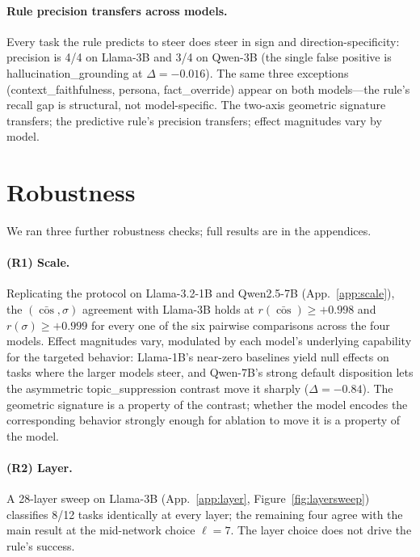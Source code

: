 \documentclass[11pt]{article}
\begin{document}
\paragraph{Rule precision transfers across models.}
Every task the rule predicts to steer does steer in sign and
direction-specificity: precision is 4/4 on Llama-3B and 3/4 on
Qwen-3B (the single false positive is hallucination\_grounding at
$\Delta = -0.016$). The same three exceptions
(context\_faithfulness, persona, fact\_override) appear on both
models---the rule's recall gap is structural, not model-specific.
The two-axis geometric signature transfers; the predictive rule's
precision transfers; effect magnitudes vary by model.

\section{Robustness}
\label{sec:robustness}

We ran three further robustness checks; full results are in the
appendices.

\paragraph{(R1) Scale.}
Replicating the protocol on Llama-3.2-1B and Qwen2.5-7B
(App.~\ref{app:scale}), the $(\bar{\cos}, \sigma)$ agreement with
Llama-3B holds at $r(\bar{\cos}) \geq +0.998$ and
$r(\sigma) \geq +0.999$ for every one of the six pairwise
comparisons across the four models. Effect magnitudes vary,
modulated by each model's underlying capability for the targeted
behavior: Llama-1B's near-zero baselines yield null effects on
tasks where the larger models steer, and Qwen-7B's strong default
disposition lets the asymmetric topic\_suppression contrast move it
sharply ($\Delta = -0.84$). The geometric signature is a property
of the contrast; whether the model encodes the corresponding
behavior strongly enough for ablation to move it is a property of
the model.

\paragraph{(R2) Layer.}
A 28-layer sweep on Llama-3B (App.~\ref{app:layer},
Figure~\ref{fig:layersweep}) classifies 8/12 tasks identically at
every layer; the remaining four agree with the main result at the
mid-network choice $\ell=7$. The layer choice does not drive the
rule's success.
\end{document}
